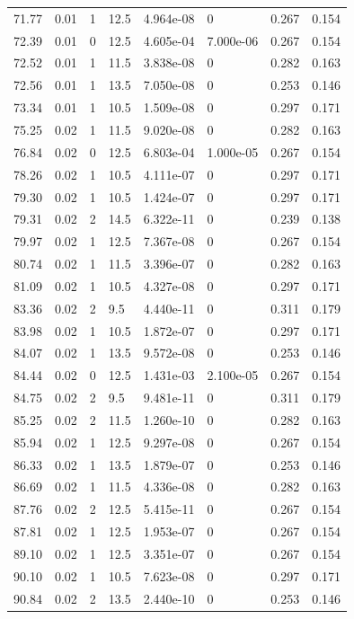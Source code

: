 \documentclass[preview]{standalone}
\begin{document}
{{{\begin{tabular}{L{1.2cm}C{1.2cm} C{0.3cm}C{0.5cm} C{1.4cm}C{1.4cm} C{1.4cm}C{1.4cm}}
  71.77  &  0.01  & 1     & 12.5 &  4.964e-08  & 0  & 0.267 &  0.154   \\ 
  72.39  &  0.01  & 0     & 12.5 &  4.605e-04  & 7.000e-06  & 0.267 &  0.154   \\ 
  72.52  &  0.01  & 1     & 11.5 &  3.838e-08  & 0  & 0.282 &  0.163   \\ 
  72.56  &  0.01  & 1     & 13.5 &  7.050e-08  & 0  & 0.253 &  0.146   \\ 
  73.34  &  0.01  & 1     & 10.5 &  1.509e-08  & 0  & 0.297 &  0.171   \\ 
  75.25  &  0.02  & 1     & 11.5 &  9.020e-08  & 0  & 0.282 &  0.163   \\ 
  76.84  &  0.02  & 0     & 12.5 &  6.803e-04  & 1.000e-05  & 0.267 &  0.154   \\ 
  78.26  &  0.02  & 1     & 10.5 &  4.111e-07  & 0  & 0.297 &  0.171   \\ 
  79.30  &  0.02  & 1     & 10.5 &  1.424e-07  & 0  & 0.297 &  0.171   \\ 
  79.31  &  0.02  & 2     & 14.5 &  6.322e-11  & 0  & 0.239 &  0.138   \\ 
  79.97  &  0.02  & 1     & 12.5 &  7.367e-08  & 0  & 0.267 &  0.154   \\ 
  80.74  &  0.02  & 1     & 11.5 &  3.396e-07  & 0  & 0.282 &  0.163   \\ 
  81.09  &  0.02  & 1     & 10.5 &  4.327e-08  & 0  & 0.297 &  0.171   \\ 
  83.36  &  0.02  & 2     & 9.5 &  4.440e-11  & 0  & 0.311 &  0.179   \\ 
  83.98  &  0.02  & 1     & 10.5 &  1.872e-07  & 0  & 0.297 &  0.171   \\ 
  84.07  &  0.02  & 1     & 13.5 &  9.572e-08  & 0  & 0.253 &  0.146   \\ 
  84.44  &  0.02  & 0     & 12.5 &  1.431e-03  & 2.100e-05  & 0.267 &  0.154   \\ 
  84.75  &  0.02  & 2     & 9.5 &  9.481e-11  & 0  & 0.311 &  0.179   \\ 
  85.25  &  0.02  & 2     & 11.5 &  1.260e-10  & 0  & 0.282 &  0.163   \\ 
  85.94  &  0.02  & 1     & 12.5 &  9.297e-08  & 0  & 0.267 &  0.154   \\ 
  86.33  &  0.02  & 1     & 13.5 &  1.879e-07  & 0  & 0.253 &  0.146   \\ 
  86.69  &  0.02  & 1     & 11.5 &  4.336e-08  & 0  & 0.282 &  0.163   \\ 
  87.76  &  0.02  & 2     & 12.5 &  5.415e-11  & 0  & 0.267 &  0.154   \\ 
  87.81  &  0.02  & 1     & 12.5 &  1.953e-07  & 0  & 0.267 &  0.154   \\ 
  89.10  &  0.02  & 1     & 12.5 &  3.351e-07  & 0  & 0.267 &  0.154   \\ 
  90.10  &  0.02  & 1     & 10.5 &  7.623e-08  & 0  & 0.297 &  0.171   \\ 
  90.84  &  0.02  & 2     & 13.5 &  2.440e-10  & 0  & 0.253 &  0.146   \\ 
\hline 
\end{tabular} 

}}}
\end{document}
